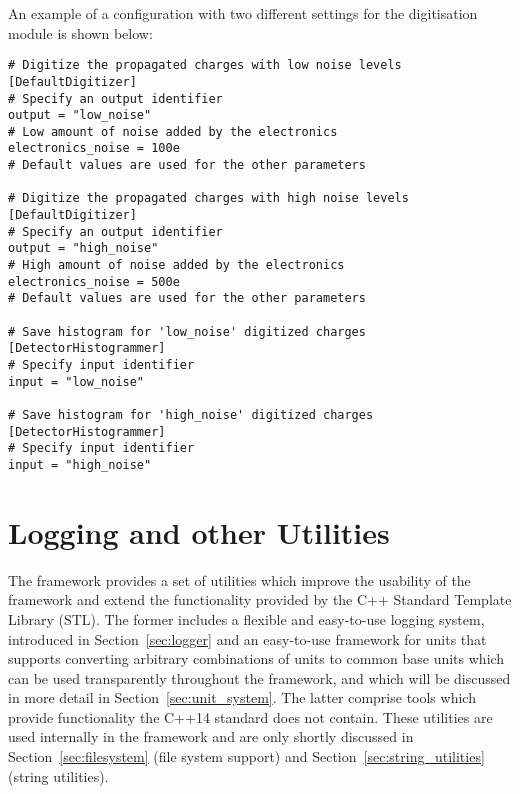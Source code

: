 An example of a configuration with two different settings for the digitisation module is shown below:
\begin{verbatim}
# Digitize the propagated charges with low noise levels
[DefaultDigitizer]
# Specify an output identifier
output = "low_noise"
# Low amount of noise added by the electronics
electronics_noise = 100e
# Default values are used for the other parameters

# Digitize the propagated charges with high noise levels
[DefaultDigitizer]
# Specify an output identifier
output = "high_noise"
# High amount of noise added by the electronics
electronics_noise = 500e
# Default values are used for the other parameters

# Save histogram for 'low_noise' digitized charges
[DetectorHistogrammer]
# Specify input identifier
input = "low_noise"

# Save histogram for 'high_noise' digitized charges
[DetectorHistogrammer]
# Specify input identifier
input = "high_noise"
\end{verbatim}


\section{Logging and other Utilities}
\label{sec:logging_utilities}
The \apsq framework provides a set of utilities which improve the usability of the framework and extend the functionality provided by the C++ Standard Template Library (STL).
The former includes a flexible and easy-to-use logging system, introduced in Section~\ref{sec:logger} and an easy-to-use framework for units that supports converting arbitrary combinations of units to common base units which can  be used transparently throughout the framework, and which will be discussed in more detail in Section~\ref{sec:unit_system}.
The latter comprise tools which provide functionality the C++14 standard does not contain.
These utilities are used internally in the framework and are only shortly discussed in Section~\ref{sec:filesystem} (file system support) and Section~\ref{sec:string_utilities} (string utilities).


